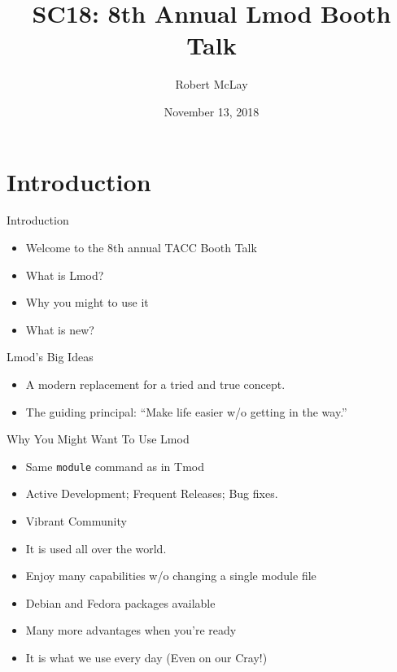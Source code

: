 \documentclass{beamer}
\begin{document}
\title[Lmod]{SC18: 8th Annual Lmod Booth Talk}
\author{Robert McLay} 
\date{November 13, 2018} 

\frame{\titlepage} 

\section{Introduction}

\begin{frame}{Introduction}
  \begin{itemize}
    \item Welcome to the 8th annual TACC Booth Talk
    \item What is Lmod?
    \item Why you might to use it
    \item What is new?
  \end{itemize}
\end{frame}

\begin{frame}{Lmod's Big Ideas}
  \begin{itemize}
    \item A modern replacement for a tried and true concept.
    \item The guiding principal: ``Make life easier w/o getting in
      the way.''
  \end{itemize}
\end{frame}

\begin{frame}{Why You Might Want To Use Lmod}
  \begin{itemize}
    \item Same \texttt{module} command as in Tmod
    \item Active Development;  Frequent Releases; Bug fixes.
    \item Vibrant Community
    \item It is used all over the world.
    \item Enjoy many capabilities w/o changing a single module file
    \item Debian and Fedora packages available
    \item Many more advantages when you're ready
    \item It is what we use every day (Even on our Cray!)
  \end{itemize}
\end{frame}
\end{document}

